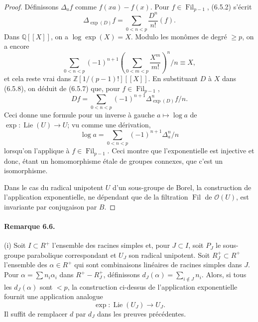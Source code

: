 \documentclass[11pt]{article}
\newcommand{\Lie}{\operatorname{Lie}}
\providecommand{\Fil}{\operatorname{Fil}}
\providecommand{\OO}{\mathcal O}
\begin{document}
\begin{proof}
Définissons \(\Delta_a f\) comme \(f(xa)-f(x)\). Pour \(f\in\Fil_{p-1}\), (6.5.2) s'écrit
\begin{equation}
  \Delta_{\exp(D)} f=\sum_{0<n<p}\frac{D^n}{n!}(f).
  \tag{6.5.7}
\end{equation}
Dans \(\mathbb Q[[X]]\), on a \(\log\exp(X)=X\). Modulo les monômes de degré \(\ge p\), on a
encore
\begin{equation}
  \sum_{0<n<p}(-1)^{n+1}\left(\sum_{0<m<p}\frac{X^m}{m!}\right)^n/n \equiv X,
  \tag{6.5.8}
\end{equation}
et cela reste vrai dans \(\mathbb Z[1/(p-1)!][[X]]\). En substituant \(D\) à \(X\) dans
(6.5.8), on déduit de (6.5.7) que, pour \(f\in\Fil_{p-1}\),
\begin{equation}
  Df=\sum_{0<n<p}(-1)^{n+1}\Delta_{\exp(D)}^n f/n.
  \tag{6.5.9}
\end{equation}
Ceci donne une formule pour un inverse à gauche \(a\mapsto\log a\) de
\(\exp:\Lie(U)\to U\); vu comme une dérivation,
\begin{equation}
  \log a=\sum_{0<n<p}(-1)^{n+1}\Delta_a^n/n
  \tag{6.5.10}
\end{equation}
lorsqu'on l'applique à \(f\in\Fil_{p-1}\). Ceci montre que l'exponentielle est injective et donc,
étant un homomorphisme étale de groupes connexes, que c'est un isomorphisme.

Dans le cas du radical unipotent \(U\) d'un sous-groupe de Borel, la construction de
l'application exponentielle, ne dépendant que de la filtration \(\Fil\) de \(\OO(U)\), est invariante
par conjugaison par \(B\).
\end{proof}

\paragraph{Remarque 6.6.}
(i) Soit \(I\subset R^+\) l'ensemble des racines simples et, pour \(J\subset I\), soit \(P_J\) le
sous-groupe parabolique correspondant et \(U_J\) son radical unipotent. Soit
\(R_J^+\subset R^+\) l'ensemble des \(\alpha\in R^+\) qui sont combinaisons linéaires de racines
simples dans \(J\). Pour \(\alpha=\sum n_i\alpha_i\) dans \(R^+-R_J^+\), définissons
\(d_J(\alpha)=\sum_{i\notin J} n_i\). Alors, si tous les \(d_J(\alpha)\) sont \(<p\), la construction
ci-dessus de l'application exponentielle fournit une application analogue
\begin{equation}
  \exp:\Lie(U_J)\longrightarrow U_J.
  \tag{6.6.1}
\end{equation}
Il suffit de remplacer \(d\) par \(d_J\) dans les preuves précédentes.
\end{document}
